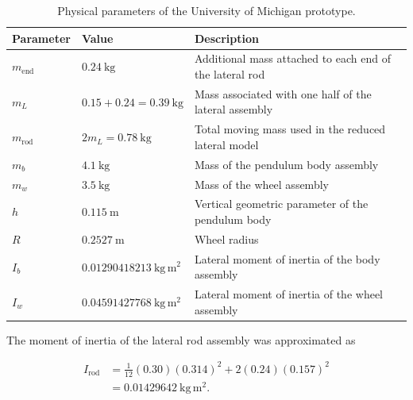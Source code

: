 \begin{table}[htbp]
  \centering
  \small
  \renewcommand{\arraystretch}{1.3}
  \caption{Physical parameters of the University of Michigan prototype.}
  \label{tab:umich-parameters}
  \begin{tabular}{
    p{}
    p{}
    p{}
  }
    \hline
    \textbf{Parameter}
    &
    \textbf{Value}
    &
    \textbf{Description}
    \\
    \hline

    $m_{\mathrm{end}}$
    &
    $0.24~\mathrm{kg}$
    &
    Additional mass attached to each end of the lateral rod
    \\

    $m_L$
    &
    $0.15+0.24=0.39~\mathrm{kg}$
    &
    Mass associated with one half of the lateral assembly
    \\

    $m_{\mathrm{rod}}$
    &
    $2m_L=0.78~\mathrm{kg}$
    &
    Total moving mass used in the reduced lateral model
    \\

    $m_b$
    &
    $4.1~\mathrm{kg}$
    &
    Mass of the pendulum body assembly
    \\

    $m_w$
    &
    $3.5~\mathrm{kg}$
    &
    Mass of the wheel assembly
    \\

    $h$
    &
    $0.115~\mathrm{m}$
    &
    Vertical geometric parameter of the pendulum body
    \\

    $R$
    &
    $0.2527~\mathrm{m}$
    &
    Wheel radius
    \\

    $I_b$
    &
    $0.01290418213~\mathrm{kg\,m^2}$
    &
    Lateral moment of inertia of the body assembly
    \\

    $I_w$
    &
    $0.04591427768~\mathrm{kg\,m^2}$
    &
    Lateral moment of inertia of the wheel assembly
    \\

    \hline
  \end{tabular}
\end{table}

The moment of inertia of the lateral rod assembly was approximated as

\begin{equation}
\begin{aligned}
I_{\mathrm{rod}}
&=
\frac{1}{12}(0.30)(0.314)^2
+
2(0.24)(0.157)^2
\\
&=
0.01429642~\mathrm{kg\,m^2}.
\end{aligned}
\label{eq:umich-rod-inertia}
\end{equation}

